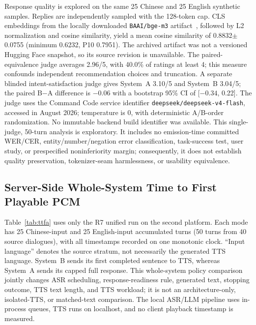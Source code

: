 \documentclass[conference]{IEEEtran}
\begin{document}
Response quality is explored on the same 25 Chinese and 25 English synthetic samples. Replies are independently sampled with the 128-token cap. CLS embeddings from the locally downloaded \texttt{BAAI/bge-m3} artifact~\cite{chen2024m3embedding}, followed by L2 normalization and cosine similarity, yield a mean cosine similarity of 0.8832$\pm$0.0755 (minimum 0.6232, P10 0.7951). The archived artifact was not a versioned Hugging Face snapshot, so its source revision is unavailable. The paired-equivalence judge averages 2.96/5, with 40.0\% of ratings at least 4; this measure confounds independent recommendation choices and truncation. A separate blinded intent-satisfaction judge gives System~A 3.10/5 and System~B 3.04/5; the paired B$-$A difference is $-0.06$ with a bootstrap 95\% CI of [$-0.34$, 0.22]. The judge uses the Command Code service identifier \texttt{deepseek/deepseek-v4-flash}, accessed in August 2026; temperature is 0, with deterministic A/B-order randomization. No immutable backend build identifier was available. This single-judge, 50-turn analysis is exploratory. It includes no emission-time committed WER/CER, entity/number/negation error classification, task-success test, user study, or prespecified noninferiority margin; consequently, it does not establish quality preservation, tokenizer-seam harmlessness, or usability equivalence.

\subsection{Server-Side Whole-System Time to First Playable PCM}

Table~\ref{tab:ttfa} uses only the R7 unified run on the second platform. Each mode has 25 Chinese-input and 25 English-input accumulated turns (50 turns from 40 source dialogues), with all timestamps recorded on one monotonic clock. ``Input language'' denotes the source stratum, not necessarily the generated TTS language. System~B sends its first completed sentence to TTS, whereas System~A sends its capped full response. This whole-system policy comparison jointly changes ASR scheduling, response-readiness rule, generated text, stopping outcome, TTS text length, and TTS workload; it is not an architecture-only, isolated-TTS, or matched-text comparison. The local ASR/LLM pipeline uses in-process queues, TTS runs on localhost, and no client playback timestamp is measured.
\end{document}
